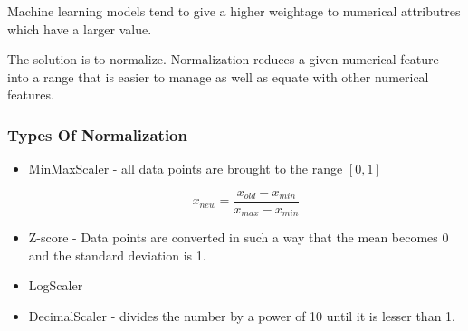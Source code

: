 \documentclass[11pt]{article}
\begin{document}
Machine learning models tend to give a higher weightage to numerical attributres which have a larger value.

The solution is to normalize. Normalization reduces a given numerical feature into a range that is easier to manage as well as equate with other numerical features.
\subsubsection{Types Of Normalization}
\label{sec:orgedb2f77}
\begin{itemize}
\item MinMaxScaler - all data points are brought to the range \([0,1]\)

$$
  x_{new} = \frac{x_{old} - x_{min}}{x_{max} - x_{min}}
  $$

\item Z-score - Data points are converted in such a way that the mean becomes 0 and the standard deviation is 1.
\item LogScaler
\item DecimalScaler - divides the number by a power of 10 until it is lesser than 1.
\end{itemize}
\end{document}
